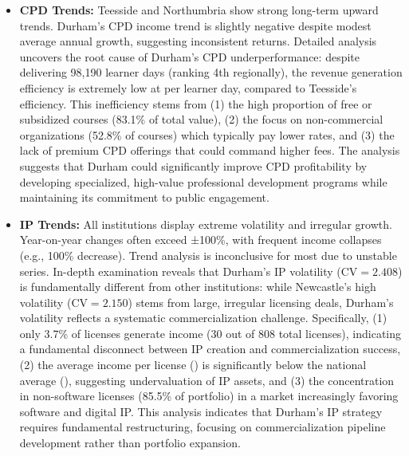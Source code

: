 \documentclass[journal,onecolumn, 10pt,draftclsnofoot]{IEEEtran}
\begin{document}
\begin{itemize}
    \item \textbf{CPD Trends:} Teesside and Northumbria show strong long-term upward trends. Durham's CPD income trend is slightly negative despite modest average annual growth, suggesting inconsistent returns. Detailed analysis uncovers the root cause of Durham's CPD underperformance: despite delivering 98,190 learner days (ranking 4th regionally), the revenue generation efficiency is extremely low at  per learner day, compared to Teesside's  efficiency. This inefficiency stems from (1) the high proportion of free or subsidized courses (83.1\% of total value), (2) the focus on non-commercial organizations (52.8\% of courses) which typically pay lower rates, and (3) the lack of premium CPD offerings that could command higher fees. The analysis suggests that Durham could significantly improve CPD profitability by developing specialized, high-value professional development programs while maintaining its commitment to public engagement.
    
    \item \textbf{IP Trends:} All institutions display extreme volatility and irregular growth. Year-on-year changes often exceed ±100\%, with frequent income collapses (e.g., 100\% decrease). Trend analysis is inconclusive for most due to unstable series. In-depth examination reveals that Durham's IP volatility ($\mathrm{CV}=2.408$) is fundamentally different from other institutions: while Newcastle's high volatility ($\mathrm{CV}=2.150$) stems from large, irregular licensing deals, Durham's volatility reflects a systematic commercialization challenge. Specifically, (1) only 3.7\% of licenses generate income (30 out of 808 total licenses), indicating a fundamental disconnect between IP creation and commercialization success, (2) the average income per license () is significantly below the national average (), suggesting undervaluation of IP assets, and (3) the concentration in non-software licenses (85.5\% of portfolio) in a market increasingly favoring software and digital IP. This analysis indicates that Durham's IP strategy requires fundamental restructuring, focusing on commercialization pipeline development rather than portfolio expansion.
\end{itemize}
\end{document}
